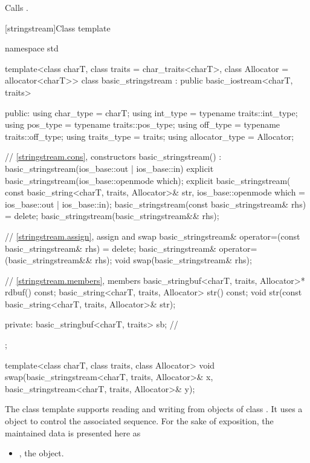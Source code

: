 \begin{itemdescr}
\pnum
\effects
Calls
.
\end{itemdescr}

[stringstream]{Class template }

%
\begin{codeblock}
namespace std {
  template<class charT, class traits = char_traits<charT>,
           class Allocator = allocator<charT>>
  class basic_stringstream : public basic_iostream<charT, traits> {
  public:
    using char_type      = charT;
    using int_type       = typename traits::int_type;
    using pos_type       = typename traits::pos_type;
    using off_type       = typename traits::off_type;
    using traits_type    = traits;
    using allocator_type = Allocator;

    // \ref{stringstream.cons}, constructors
    basic_stringstream() : basic_stringstream(ios_base::out | ios_base::in) {}
    explicit basic_stringstream(ios_base::openmode which);
    explicit basic_stringstream(
      const basic_string<charT, traits, Allocator>& str,
      ios_base::openmode which = ios_base::out | ios_base::in);
    basic_stringstream(const basic_stringstream& rhs) = delete;
    basic_stringstream(basic_stringstream&& rhs);

    // \ref{stringstream.assign}, assign and swap
    basic_stringstream& operator=(const basic_stringstream& rhs) = delete;
    basic_stringstream& operator=(basic_stringstream&& rhs);
    void swap(basic_stringstream& rhs);

    // \ref{stringstream.members}, members
    basic_stringbuf<charT, traits, Allocator>* rdbuf() const;
    basic_string<charT, traits, Allocator> str() const;
    void str(const basic_string<charT, traits, Allocator>& str);

  private:
    basic_stringbuf<charT, traits> sb;  // \expos
  };

  template<class charT, class traits, class Allocator>
    void swap(basic_stringstream<charT, traits, Allocator>& x,
              basic_stringstream<charT, traits, Allocator>& y);
}
\end{codeblock}

\pnum
The
class template
supports reading and writing from objects of class
.
It uses a
object to control the associated sequence.
For the sake of exposition, the maintained data is presented here as
\begin{itemize}
\item
{}, the  object.
\end{itemize}

